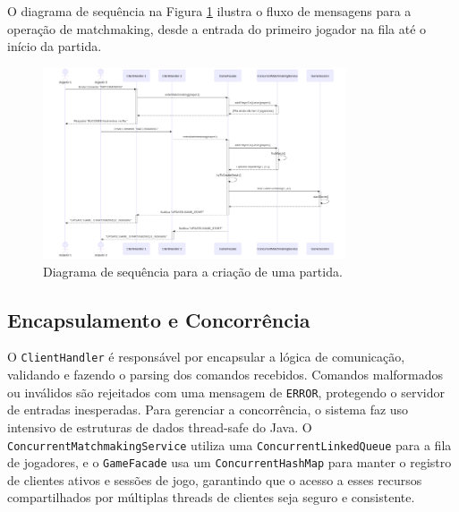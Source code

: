 \documentclass[12pt,a4paper]{article}
\begin{document}
O diagrama de sequência na Figura \ref{fig:sequencia} ilustra o fluxo de mensagens para a operação de matchmaking, desde a entrada do primeiro jogador na fila até o início da partida.

\begin{figure}[h!]
\centering
\includegraphics[width=0.8\textwidth]{figuras/sequencia.png}
\caption{Diagrama de sequência para a criação de uma partida.}
\label{fig:sequencia}
\end{figure}

\subsection{Encapsulamento e Concorrência}
O \texttt{ClientHandler} é responsável por encapsular a lógica de comunicação, validando e fazendo o parsing dos comandos recebidos. Comandos malformados ou inválidos são rejeitados com uma mensagem de \texttt{ERROR}, protegendo o servidor de entradas inesperadas. Para gerenciar a concorrência, o sistema faz uso intensivo de estruturas de dados thread-safe do Java. O \texttt{ConcurrentMatchmakingService} utiliza uma \texttt{ConcurrentLinkedQueue} para a fila de jogadores, e o \texttt{GameFacade} usa um \texttt{ConcurrentHashMap} para manter o registro de clientes ativos e sessões de jogo, garantindo que o acesso a esses recursos compartilhados por múltiplas threads de clientes seja seguro e consistente.
\end{document}
